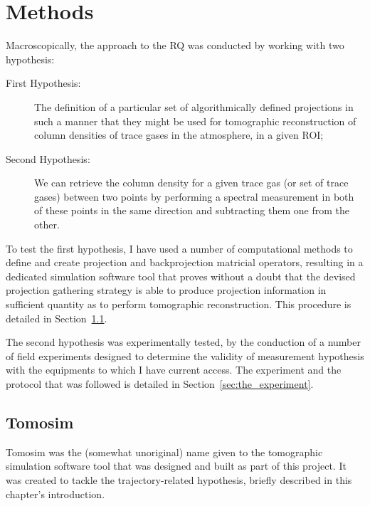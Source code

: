 \chapter{Methods}
\label{cha:methods}

Macroscopically, the approach to the \gls{RQ} was conducted by working
with two hypothesis:
\begin{description}
    \item[First Hypothesis:] The definition of a particular set of
        algorithmically defined projections in such a manner that they
        might be used for tomographic reconstruction of column densities
        of trace gases in the atmosphere, in a given \gls{ROI};
    \item[Second Hypothesis:] We can retrieve the column density for a
        given trace gas (or set of trace gases) between two points by
        performing a spectral measurement in both of these points in the
        same direction and subtracting them one from the other.
\end{description}

To test the first hypothesis, I have used a number of computational
methods to define and create projection and backprojection matricial
operators, resulting in a dedicated simulation software tool that proves
without a doubt that the devised projection gathering strategy is able
to produce projection information in sufficient quantity as to perform
tomographic reconstruction. This procedure is detailed in
Section~\ref{sec:tomosim}. 

The second hypothesis was experimentally tested, by the conduction of a
number of field experiments designed to determine the validity of
measurement hypothesis with the equipments to which I have current
access. The experiment and the protocol that was followed is detailed in
Section~\ref{sec:the_experiment}.

\section{Tomosim}%
\label{sec:tomosim}

Tomosim was the (somewhat unoriginal) name given to the tomographic
simulation software tool that was designed and built as part of this
project. It was created to tackle the trajectory-related hypothesis,
briefly described in this chapter's introduction.

